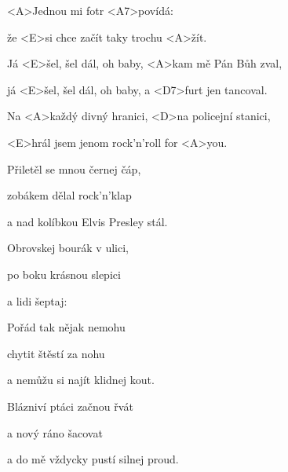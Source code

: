 

\zs
<A>Jednou mi fotr <A7>povídá:


že <E>si chce začít taky trochu <A>žít.

\ks

\zr
Já <E>šel, šel dál, oh baby, <A>kam mě Pán Bůh zval,

já <E>šel, šel dál, oh baby, a <D7>furt jen tancoval.

Na <A>každý divný hranici, <D>na policejní stanici,

<E>hrál jsem jenom rock'n'roll for <A>you.
\kr

\zs
Přiletěl se mnou černej čáp,

zobákem dělal rock'n'klap

a nad kolíbkou Elvis Presley stál.

Obrovskej bourák v ulici,

po boku krásnou slepici

a lidi šeptaj: 
\ks

\zr \kr

\zs
Pořád tak nějak nemohu

chytit štěstí za nohu

a nemůžu si najít klidnej kout.

Blázniví ptáci začnou řvát

a nový ráno šacovat

a do mě vždycky pustí silnej proud.
\ks

\zr \kr

\kp
